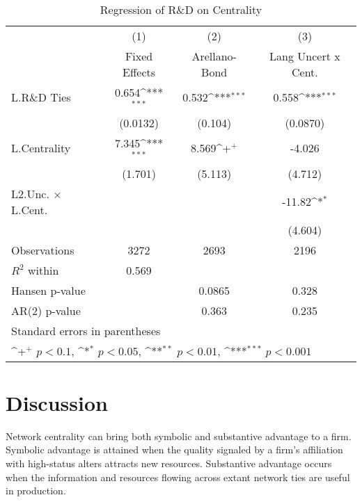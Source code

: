 \begin{table}[htbp]\centering \caption{Regression of R\&D on Centrality\label{r8}}
{
\def\sym#1{\ifmmode^{#1}\else\(^{#1}\)\fi}
\begin{tabular}{l*{3}{c}}
\hline\hline
                    &\multicolumn{1}{c}{(1)}&\multicolumn{1}{c}{(2)}&\multicolumn{1}{c}{(3)}\\
                    &\multicolumn{1}{c}{Fixed Effects}&\multicolumn{1}{c}{Arellano-Bond}&\multicolumn{1}{c}{Lang Uncert x Cent.}\\
\hline
L.R\&D Ties         &       0.654\sym{***}&       0.532\sym{***}&       0.558\sym{***}\\
                    &    (0.0132)         &     (0.104)         &    (0.0870)         \\
L.Centrality        &       7.345\sym{***}&       8.569\sym{+}  &      -4.026         \\
                    &     (1.701)         &     (5.113)         &     (4.712)         \\
L2.Unc. $\times$ L.Cent.&                     &                     &      -11.82\sym{*}  \\
                    &                     &                     &     (4.604)         \\
\hline
Observations        &        3272         &        2693         &        2196         \\
$R^2$ within                &       0.569         &                     &                     \\
Hansen p-value             &                     &      0.0865         &       0.328         \\
AR(2) p-value                &                     &       0.363         &       0.235         \\
\hline\hline
\multicolumn{4}{l}{\footnotesize Standard errors in parentheses}\\
\multicolumn{4}{l}{\footnotesize \sym{+} \(p<0.1\), \sym{*} \(p<0.05\), \sym{**} \(p<0.01\), \sym{***} \(p<0.001\)}\\
\end{tabular}
}
\end{table}

\section{Discussion}



Network centrality can bring both symbolic and substantive advantage to a firm. Symbolic advantage is attained when the quality signaled by a firm's affiliation with high-status alters attracts new resources. Substantive advantage occurs when the information and resources flowing across extant network ties are useful in production. 

